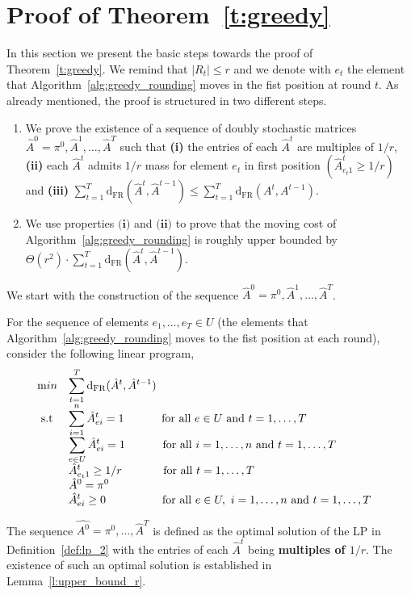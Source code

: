 \documentclass[a4paper,UKenglish,cleveref,autoref, thm-restate]{lipics-v2019}
\def\dfr{\mathrm{d}_{\mathrm{FR}}}
\begin{document}
\section{Proof of Theorem~\ref{t:greedy}}\label{s:greedy}
 \noindent In this section we present the basic steps towards the proof of Theorem~\ref{t:greedy}. We remind that $|R_t| \leq r$ and we denote with $e_t$ the element that Algorithm~\ref{alg:greedy_rounding} moves in the fist position at round $t$. As already mentioned, the proof is structured in two 
 different steps.
 \smallskip
 \begin{enumerate}
     \item We prove the existence of a sequence of doubly stochastic matrices $\hat{A}^0 = \pi^0,\hat{A}^1,\ldots,\hat{A}^T$ such that \textbf{(i)} the entries of each $\hat{A}^t$ are multiples of $1/r$, \textbf{(ii)} each $\hat{A}^t$ admits $1/r$ mass for element $e_t$ in first position $(\hat{A}^t_{e_t 1} \geq 1/r)$ and
     \textbf{(iii)}
     $\sum_{t=1}^T \dfr(\hat{A}^t,\hat{A}^{t-1}) \leq \sum_{t=1}^T \dfr(A^t,A^{t-1})$.\smallskip
     \item We use properties $\textbf{(i)}$ and $\textbf{(ii)}$ to prove that the moving cost of Algorithm~\ref{alg:greedy_rounding} is roughly upper bounded by $\Theta(r^2) \cdot \sum_{t=1}^T \dfr(\hat{A}^t,\hat{A}^{t-1})$.
 \end{enumerate}

\noindent We start with the construction of the sequence $\hat{A}^0=\pi^0,\hat{A}^1,\ldots,\hat{A}^T$.
\begin{definition}\label{def:lp_2}
For the sequence of elements $e_1,\ldots,e_T \in U$ (the elements that Algorithm~\ref{alg:greedy_rounding} moves to the fist position at each round), consider the following linear program,
\begin{equation*}
    \begin{array}{ll@{}ll}
        \text min & \displaystyle \sum_{t=1}^T \dfr(\hat{A}^t,\hat{A}^{t-1})&\\
        \text{ s.t } & \displaystyle \sum_{i=1}^{n} \hat{A}_{ei}^t = 1 ~~~~~~~~~~\text{for all } e \in U \text{ and } t = 1,\ldots, T  &&\\
        & \displaystyle \sum_{e \in U} \hat{A}_{ei}^t = 1
        ~~~~~~~~~~\text{for all } i = 1, \ldots, n \text{ and } t = 1, \ldots, T  &&\\
        & \displaystyle \hat{A}_{e_t1}^t \geq 1/r ~~~~~~~~~~~\text{for all } t = 1, \ldots, T&\\
        &\displaystyle \hat{A}^0 = \pi^0 &\\
        & \displaystyle\hat{A}_{ei}^t\geq 0~~~~~~~~~~~~~~~\text{for all } e \in U, ~i = 1,\ldots, n  \text{ and }t = 1,\ldots, T&\\
    \end{array}
\end{equation*}
\end{definition}
\noindent The sequence $\hat{A^0}=\pi^0,\ldots,\hat{A}^T$ is defined as the optimal solution of the LP in Definition~\ref{def:lp_2} with the entries of each $\hat{A}^t$ being \textbf{multiples of $1/r$}. The existence of such an optimal solution is established in Lemma~\ref{l:upper_bound_r}.   
\end{document}
